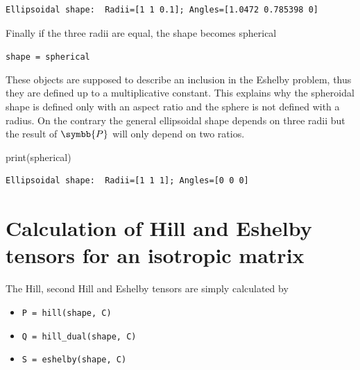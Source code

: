 \documentclass[
  a4paper,
  numbers=noendperiod,
  DIV=12]{scrreprt}
\newenvironment{Shaded}{\begin{snugshade}}{\end{snugshade}}
\newcommand{\BuiltInTok}[1]{#1}
\newcommand{\NormalTok}[1]{#1}
\providecommand{\tightlist}{%
  \setlength{\itemsep}{0pt}\setlength{\parskip}{0pt}}
\newcommand{\uuuu}[1]{{\symbb{{#1}}}}
\begin{document}
\begin{verbatim}
Ellipsoidal shape:  Radii=[1 1 0.1]; Angles=[1.0472 0.785398 0]
\end{verbatim}

Finally if the three radii are equal, the shape becomes spherical

\texttt{shape\ =\ spherical}

\begin{tcolorbox}[enhanced jigsaw, arc=.35mm, bottomrule=.15mm, bottomtitle=1mm, breakable, colback=white, colbacktitle=quarto-callout-warning-color!10!white, colframe=quarto-callout-warning-color-frame, coltitle=black, left=2mm, leftrule=.75mm, opacityback=0, opacitybacktitle=0.6, rightrule=.15mm, title=\textcolor{quarto-callout-warning-color}{\faExclamationTriangle}\hspace{0.5em}{Warning}, titlerule=0mm, toprule=.15mm, toptitle=1mm]

These objects are supposed to describe an inclusion in the Eshelby
problem, thus they are defined up to a multiplicative constant. This
explains why the spheroidal shape is defined only with an aspect ratio
and the sphere is not defined with a radius. On the contrary the general
ellipsoidal shape depends on three radii but the result of \(\uuuu{P}\)
will only depend on two ratios.

\end{tcolorbox}

\begin{Shaded}
\begin{Highlighting}[]
\BuiltInTok{print}\NormalTok{(spherical)}
\end{Highlighting}
\end{Shaded}

\begin{verbatim}
Ellipsoidal shape:  Radii=[1 1 1]; Angles=[0 0 0]
\end{verbatim}

\section{Calculation of Hill and Eshelby tensors for an isotropic
matrix}\label{calculation-of-hill-and-eshelby-tensors-for-an-isotropic-matrix}

The Hill, second Hill and Eshelby tensors are simply calculated by

\begin{itemize}
\tightlist
\item
  \texttt{P\ =\ hill(shape,\ C)}
\item
  \texttt{Q\ =\ hill\_dual(shape,\ C)}
\item
  \texttt{S\ =\ eshelby(shape,\ C)}
\end{itemize}
\end{document}
